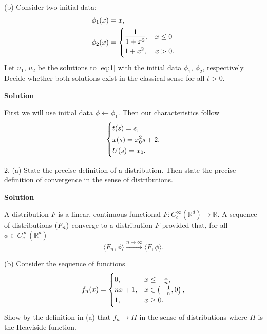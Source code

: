 \documentclass{article}
\begin{document}
\vspace{5mm}

(b) Consider two initial data:
%
\begin{align*}
    \phi_1(x) &= x, \\
    \phi_2(x) &=
        \begin{dcases}
            \frac{1}{1 + x^2}, & x \leq 0 \\
            1 + x^2, & x > 0.
        \end{dcases}
\end{align*}
%
Let $u_1$, $u_2$ be the solutions to \eqref{eq:1} with the initial data
$\phi_1$, $\phi_2$, respectively. Decide whether both solutions exist in
the classical sense for all $t > 0$.

\textbf{Solution}

First we will use initial data $\phi \gets \phi_1$. Then our
characteristics follow
%
\begin{equation*}
    \begin{dcases}
        t(s) = s, \\
        x(s) = x_0^2 s + 2, \\
        U(s) = x_0
        .
    \end{dcases}
\end{equation*}

\newpage

2. (a) State the precise definition of a distribution. Then state the
precise definition of convergence in the sense of distributions.

\textbf{Solution}

A distribution $F$ is a linear, continuous functional $F:
C_c^\infty(\mathbb{R}^d) \to \mathbb{R}$. A sequence of distributions
$\del{F_n}$ converge to a distribution $F$ provided that, for all $\phi
\in C_c^\infty(\mathbb{R}^d)$
%
\begin{equation*}
    \langle F_n, \phi \rangle \xrightarrow{n \to \infty} \langle F, \phi \rangle
    .
\end{equation*}

\vspace{5mm}

(b) Consider the sequence of functions
%
\begin{equation*}
    f_n(x) =
        \begin{cases}
            0, & x \leq -\frac{1}{n}, \\
            n x + 1, & x \in \del{- \frac{1}{n}, 0}, \\
            1, & x \geq 0.
        \end{cases}
\end{equation*}
%
Show by the definition in (a) that $f_n \to H$ in the sense of
distributions where $H$ is the Heaviside function.
\end{document}
